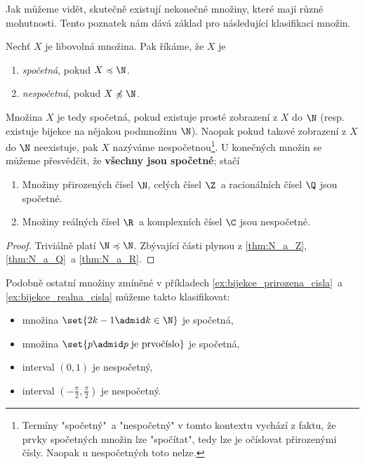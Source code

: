 \needspace{1cm}
Jak můžeme vidět, skutečně existují nekonečné množiny, které mají různé mohutnosti.  Tento poznatek nám dává základ pro následující klasifikaci množin.
\begin{definition}\label{def:spocetna_a_nespocetna_mnozina}
    Nechť $X$ je libovolná množina. Pak říkáme, že $X$ je
    \begin{enumerate}[label=(\roman*)]
        \item \emph{spočetná}, pokud $X\preccurlyeq\N$.
        \item \emph{nespočetná}, pokud $X\not\preccurlyeq\N$.
    \end{enumerate}
\end{definition}
Množina $X$ je tedy spočetná, pokud existuje prosté zobrazení z $X$ do $\N$ (resp. existuje bijekce na nějakou podmnožinu $\N$). Naopak pokud takové zobrazení z $X$ do $\N$ neexistuje, pak $X$ nazýváme nespočetnou\footnote{Termíny "spočetný"~a "nespočetný" v tomto kontextu vychází z faktu, že prvky spočetných množin lze "spočítat", tedy lze je očíslovat přirozenými čísly. Naopak u nespočetných toto nelze.}. U konečných množin se můžeme přesvědčit, že \textbf{všechny jsou spočetné}; stačí 
\begin{theorem}\label{thm:spocetnost_ciselnych_oboru}
    \begin{enumerate}[label=(\roman*)]
        \item Množiny přirozených čísel $\N$, celých čísel $\Z$~a racionálních čísel $\Q$ jsou spočetné.
        \item Množiny reálných čísel $\R$~a komplexních čísel $\C$ jsou nespočetné.
    \end{enumerate}
\end{theorem}
\begin{proof}
    Triviálně platí $\N\preccurlyeq\N$. Zbývající části plynou z \ref{thm:N_a_Z}, \ref{thm:N_a_Q}~a \ref{thm:N_a_R}.
\end{proof}
Podobně ostatní množiny zmíněné v příkladech \ref{ex:bijekce_prirozena_cisla}~a \ref{ex:bijekce_realna_cisla} můžeme takto klasifikovat:
\begin{itemize}
    \item množina $\set{2k-1 \admid k\in\N}$ je spočetná,
    \item množina $\set{p \admid p\;\text{je prvočíslo}}$ je spočetná,
    \item interval $(0,1)$ je nespočetný,
    \item interval $\displaystyle\left(-\frac{\pi}{2},\frac{\pi}{2}\right)$ je nespočetný.
\end{itemize}
\medskip

